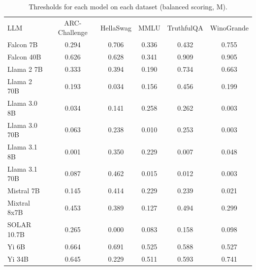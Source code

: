 \begin{table}[h]
\caption{Thresholds for each model on each dataset (balanced scoring, M). }
\label{tab:thresholds_prob_margin_k20_w1}
\centering
\begin{tabular}{l S[table-format=3.1] S[table-format=3.1] S[table-format=3.1] S[table-format=3.1] S[table-format=3.1]}
\toprule
LLM & ARC-Challenge & HellaSwag & MMLU & TruthfulQA & WinoGrande \\ 
\cmidrule(lr){1-1} \cmidrule(lr){2-2} \cmidrule(lr){3-3} \cmidrule(lr){4-4} \cmidrule(lr){5-5} \cmidrule(lr){6-6}
Falcon 7B & 0.294 & 0.706 & 0.336 & 0.432 & 0.755\\
Falcon 40B & 0.626 & 0.628 & 0.341 & 0.909 & 0.905\\
Llama 2 7B & 0.333 & 0.394 & 0.190 & 0.734 & 0.663\\
Llama 2 70B & 0.193 & 0.034 & 0.156 & 0.456 & 0.199\\
Llama 3.0 8B & 0.034 & 0.141 & 0.258 & 0.262 & 0.003\\
Llama 3.0 70B & 0.063 & 0.238 & 0.010 & 0.253 & 0.003\\
Llama 3.1 8B & 0.001 & 0.350 & 0.229 & 0.007 & 0.048\\
Llama 3.1 70B & 0.087 & 0.462 & 0.015 & 0.012 & 0.003\\
Mistral 7B & 0.145 & 0.414 & 0.229 & 0.239 & 0.021\\
Mixtral 8x7B & 0.453 & 0.389 & 0.127 & 0.494 & 0.299\\
SOLAR 10.7B & 0.265 & 0.000 & 0.083 & 0.158 & 0.098\\
Yi 6B & 0.664 & 0.691 & 0.525 & 0.588 & 0.527\\
Yi 34B & 0.645 & 0.229 & 0.511 & 0.593 & 0.741\\
\bottomrule
\end{tabular}
\end{table}

